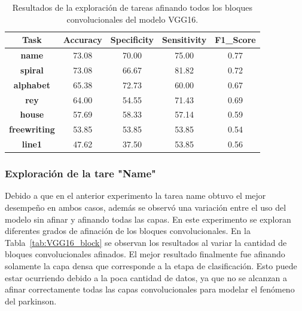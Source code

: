 \documentclass[10pt, a4paper]{article}
\begin{document}
\begin{table}[h!!]
\caption{Resultados de la exploración de tareas afinando todos los bloques convolucionales 
del modelo VGG16.}
\centering
\label{tab:VGG16_tuned}
\begin{tabular}{ccccc}
\hline
\textbf{Task}        & \textbf{Accuracy} & \textbf{Specificity} & \textbf{Sensitivity} & \textbf{F1\_Score} \\ \hline
\textbf{name}        & 73.08             & 70.00                & 75.00                & 0.77               \\
\textbf{spiral}      & 73.08             & 66.67                & 81.82                & 0.72               \\
\textbf{alphabet}    & 65.38             & 72.73                & 60.00                & 0.67               \\
\textbf{rey}         & 64.00             & 54.55                & 71.43                & 0.69               \\
\textbf{house}       & 57.69             & 58.33                & 57.14                & 0.59               \\
\textbf{freewriting} & 53.85             & 53.85                & 53.85                & 0.54               \\
\textbf{line1}       & 47.62             & 37.50                & 53.85                & 0.56               \\ \hline
\end{tabular}
\end{table}

\subsubsection*{Exploración de la tare "Name"}

Debido a que en el anterior experimento la tarea name obtuvo el mejor desempeño en ambos casos, además
se observó una variación entre el uso del modelo sin afinar y afinando todas las capas. En este experimento
se exploran diferentes grados de afinación de los bloques convolucionales. En la Tabla~\ref*{tab:VGG16_block}
se observan los resultados al variar la cantidad de bloques convolucionales afinados. El mejor resultado 
finalmente fue afinando solamente la capa densa que corresponde a la etapa de clasificación. Esto puede estar 
ocurriendo debido a la poca cantidad de datos, ya que no se alcanzan a afinar correctamente todas las capas
convolucionales para modelar el fenómeno del parkinson.
\end{document}

